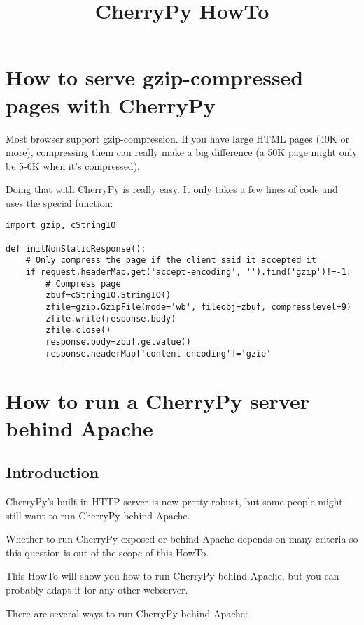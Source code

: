 \documentclass{manual}
\title{CherryPy HowTo}
\begin{document}
\maketitle

\tableofcontents

\chapter{How to serve gzip-compressed pages with CherryPy}

Most browser support gzip-compression. If you have large HTML pages (40K or more),
compressing them can really make a big difference (a 50K page might only be 5-6K
when it's compressed).

Doing that with CherryPy is really easy. It only takes a few lines of code and uses
the  special function:
\begin{verbatim}
import gzip, cStringIO

def initNonStaticResponse():
    # Only compress the page if the client said it accepted it
    if request.headerMap.get('accept-encoding', '').find('gzip')!=-1:
        # Compress page
        zbuf=cStringIO.StringIO()
        zfile=gzip.GzipFile(mode='wb', fileobj=zbuf, compresslevel=9)
        zfile.write(response.body)
        zfile.close()
        response.body=zbuf.getvalue()
        response.headerMap['content-encoding']='gzip'
\end{verbatim}


\chapter{How to run a CherryPy server behind Apache}

\section{Introduction}

CherryPy's built-in HTTP server is now pretty robust, but some people might still want to run CherryPy behind Apache.

Whether to run CherryPy exposed or behind Apache depends on many criteria so this question is out of the scope of this HowTo.

This HowTo will show you how to run CherryPy behind Apache, but you can probably adapt it for any other
webserver.

There are several ways to run CherryPy behind Apache:
\end{document}
